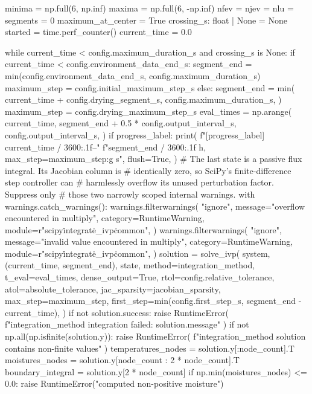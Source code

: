 \documentclass[withoutpreface,bwprint]{cumcmthesis}
\begin{document}
\begin{PythonCode}
    minima = np.full(6, np.inf)
    maxima = np.full(6, -np.inf)
    nfev = njev = nlu = segments = 0
    maximum_at_center = True
    crossing_s: float | None = None
    started = time.perf_counter()
    current_time = 0.0

    while current_time < config.maximum_duration_s and crossing_s is None:
        if current_time < config.environment_data_end_s:
            segment_end = min(config.environment_data_end_s, config.maximum_duration_s)
            maximum_step = config.initial_maximum_step_s
        else:
            segment_end = min(
                current_time + config.drying_segment_s,
                config.maximum_duration_s,
            )
            maximum_step = config.drying_maximum_step_s
        eval_times = np.arange(
            current_time,
            segment_end + 0.5 * config.output_interval_s,
            config.output_interval_s,
        )
        if progress_label:
            print(
                f"[{progress_label}] {current_time / 3600:.1f}–"
                f"{segment_end / 3600:.1f} h, max_step={maximum_step:g} s",
                flush=True,
            )
        # The last state is a passive flux integral. Its Jacobian column is
        # identically zero, so SciPy's finite-difference step controller can
        # harmlessly overflow its unused perturbation factor. Suppress only
        # those two narrowly scoped internal warnings.
        with warnings.catch_warnings():
            warnings.filterwarnings(
                "ignore",
                message="overflow encountered in multiply",
                category=RuntimeWarning,
                module=r"scipy\.integrate\._ivp\.common",
            )
            warnings.filterwarnings(
                "ignore",
                message="invalid value encountered in multiply",
                category=RuntimeWarning,
                module=r"scipy\.integrate\._ivp\.common",
            )
            solution = solve_ivp(
                system,
                (current_time, segment_end),
                state,
                method=integration_method,
                t_eval=eval_times,
                dense_output=True,
                rtol=config.relative_tolerance,
                atol=absolute_tolerance,
                jac_sparsity=jacobian_sparsity,
                max_step=maximum_step,
                first_step=min(config.first_step_s, segment_end - current_time),
            )
        if not solution.success:
            raise RuntimeError(
                f"{integration_method} integration failed: {solution.message}"
            )
        if not np.all(np.isfinite(solution.y)):
            raise RuntimeError(
                f"{integration_method} solution contains non-finite values"
            )
        temperatures_nodes = solution.y[:node_count].T
        moistures_nodes = solution.y[node_count : 2 * node_count].T
        boundary_integral = solution.y[2 * node_count]
        if np.min(moistures_nodes) <= 0.0:
            raise RuntimeError("computed non-positive moisture")


\end{PythonCode}
\end{document}
